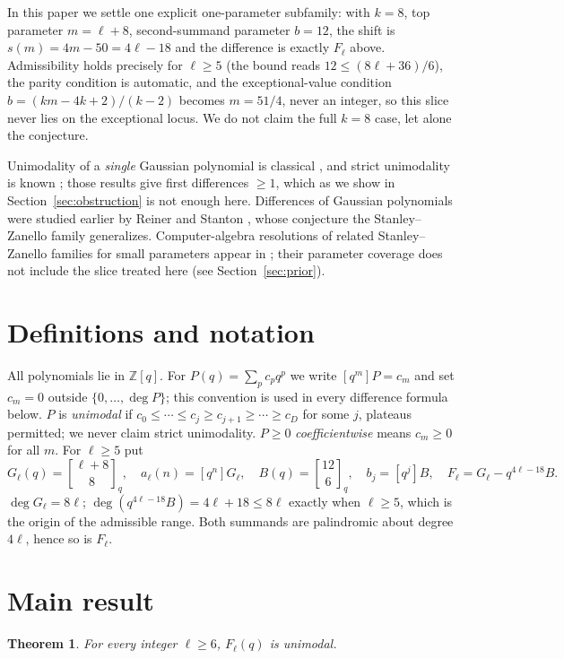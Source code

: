 \documentclass[11pt]{article}
\newtheorem{theorem}{Theorem}
\theoremstyle{definition}
\newcommand{\gauss}[2]{\genfrac{[}{]}{0pt}{0}{#1}{#2}_q}
\newcommand{\coeff}[1]{[q^{#1}]}
\begin{document}
In this paper we settle one explicit one-parameter subfamily: with $k=8$, top parameter
$m=\ell+8$, second-summand parameter $b=12$, the shift is $s(m)=4m-50=4\ell-18$ and the difference
is exactly $F_\ell$ above. Admissibility holds precisely for $\ell\ge 5$ (the bound reads
$12\le(8\ell+36)/6$), the parity condition is automatic, and the exceptional-value condition
$b=(km-4k+2)/(k-2)$ becomes $m=51/4$, never an integer, so this slice never lies on the exceptional
locus. We do not claim the full $k=8$ case, let alone the conjecture.

Unimodality of a \emph{single} Gaussian polynomial is classical \cite{ohara,zeilberger}, and
strict unimodality is known \cite{pakpanova,zanello2015}; those results give first differences
$\ge 1$, which as we show in Section~\ref{sec:obstruction} is not enough here. Differences of
Gaussian polynomials were studied earlier by Reiner and Stanton \cite{reinerstanton}, whose
conjecture the Stanley--Zanello family generalizes. Computer-algebra resolutions of related
Stanley--Zanello families for small parameters appear in \cite{kuw}; their parameter coverage does
not include the slice treated here (see Section~\ref{sec:prior}).

\section{Definitions and notation}

All polynomials lie in $\mathbb{Z}[q]$. For $P(q)=\sum_p c_p q^p$ we write $\coeff{m}P=c_m$ and set
$c_m=0$ outside $\{0,\dots,\deg P\}$; this convention is used in every difference formula below.
$P$ is \emph{unimodal} if $c_0\le\cdots\le c_j\ge c_{j+1}\ge\cdots\ge c_D$ for some $j$, plateaus
permitted; we never claim strict unimodality. $P\ge 0$ \emph{coefficientwise} means $c_m\ge 0$ for
all $m$. For $\ell\ge 5$ put
\[
  G_\ell(q)=\gauss{\ell+8}{8},\quad a_\ell(n)=\coeff{n}G_\ell,\quad
  B(q)=\gauss{12}{6},\quad b_j=\coeff{j}B,\quad
  F_\ell=G_\ell-q^{4\ell-18}B .
\]
$\deg G_\ell=8\ell$; $\deg(q^{4\ell-18}B)=4\ell+18\le 8\ell$ exactly when $\ell\ge5$, which is the
origin of the admissible range. Both summands are palindromic about degree $4\ell$, hence so is
$F_\ell$.

\section{Main result}

\begin{theorem}\label{thm:main}
For every integer $\ell\ge 6$, $F_\ell(q)$ is unimodal.
\end{theorem}
\end{document}
